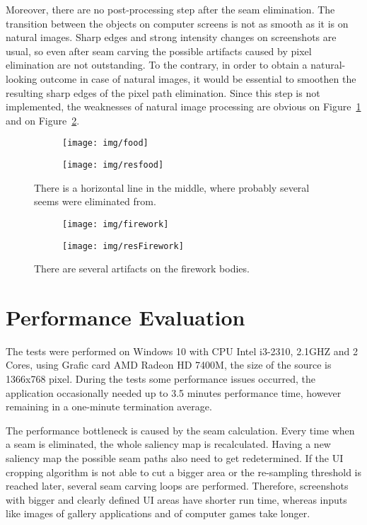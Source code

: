 \documentclass[draft,final]{vutinfth} %
\begin{document}
	Moreover, there are no post-processing step after the seam elimination.
	The transition between the objects on computer screens is not as smooth as it is on natural images.
	Sharp edges and strong intensity changes on screenshots are usual, so even after seam carving the possible artifacts caused by pixel elimination are not outstanding. 
	To the contrary, in order to obtain a natural-looking outcome in case of natural images, it would be essential to smoothen the resulting sharp edges of the pixel path elimination. 
	Since this step is not implemented, the weaknesses of natural image processing are obvious on Figure~\ref{fig:nat:food} and on Figure~\ref{fig:nat:fire}.  
	\begin{figure}[h]
		\centering
		\begin{subfigure}[b]{0.45\columnwidth}
			\centering
			\texttt{[image: img/food]}
		\end{subfigure}
		\begin{subfigure}[b]{0.45\columnwidth}
			\centering
			\texttt{[image: img/resfood]}
		\end{subfigure}
		\caption{There is a horizontal line in the middle, where probably several seems were eliminated from.}
		\label{fig:nat:food}
	\end{figure}  
	\begin{figure}[h]
		\centering
		\begin{subfigure}[b]{0.45\columnwidth}
			\centering
			\texttt{[image: img/firework]}
		\end{subfigure}
		\begin{subfigure}[b]{0.45\columnwidth}
			\centering
			\texttt{[image: img/resFirework]}
		\end{subfigure}
		\caption{There are several artifacts on the firework bodies.}
		\label{fig:nat:fire}
	\end{figure}    
	
	
	\section{Performance Evaluation}
	The tests were performed on Windows 10 with CPU Intel i3-2310, 2.1GHZ and 2 Cores, using Grafic card AMD Radeon HD 7400M, the size of the source is 1366x768 pixel.
	During the tests some performance issues occurred, the application occasionally needed up to 3.5 minutes performance time, however remaining in a one-minute termination average.\par 
	The performance bottleneck is caused by the seam calculation.
	Every time when a seam is eliminated, the whole saliency map is recalculated.
	Having a new saliency map the possible seam paths also need to get redetermined.
	If the UI cropping algorithm is not able to cut a bigger area or the re-sampling threshold is reached later, several seam carving loops are performed. 
	Therefore, screenshots with bigger and clearly defined UI areas have shorter run time, whereas inputs like images of gallery applications and of computer games take longer. 
	
\end{document}
